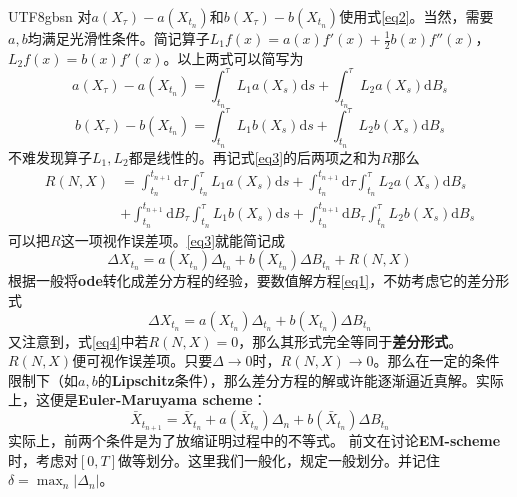 \documentclass{article}
\begin{document}
\begin{CJK*}{UTF8}{gbsn}
对$a(X_\tau)-a(X_{t_{n}})$和$b(X_\tau)-b(X_{t_{n}})$使用式\ref{eq2}。当然，需要$a,b$均满足光滑性条件。简记算子$L_1f(x)=a(x)f'(x)+\frac{1}{2}b(x)f''(x)$，$L_2f(x)=b(x)f'(x)$。以上两式可以简写为
\begin{equation}\label{eq6}
a(X_\tau)-a(X_{t_{n}})=\int_{t_n}^\tau L_1a(X_s)\mathrm{d}s+\int_{t_n}^\tau L_2a(X_s)\mathrm{d}B_s
\end{equation}
\begin{equation}\label{eq7}
b(X_\tau)-b(X_{t_{n}})=\int_{t_n}^\tau L_1b(X_s)\mathrm{d}s+\int_{t_n}^\tau L_2b(X_s)\mathrm{d}B_s
\end{equation}
不难发现算子$L_1,L_2$都是线性的。再记式\ref{eq3}的后两项之和为$R$那么
\begin{equation}\begin{aligned}
R(N,X)
&=\int_{t_n}^{t_{n+1}}\mathrm{d}\tau\int_{t_n}^\tau L_1a(X_s)\mathrm{d}s+
\int_{t_n}^{t_{n+1}}\mathrm{d}\tau\int_{t_n}^\tau L_2a(X_s)\mathrm{d}B_s\\
&+\int_{t_n}^{t_{n+1}}\mathrm{d}B_\tau\int_{t_n}^\tau L_1b(X_s)\mathrm{d}s
+\int_{t_n}^{t_{n+1}}\mathrm{d}B_\tau\int_{t_n}^\tau L_2b(X_s)\mathrm{d}B_s
\end{aligned}\label{eq8}\end{equation}
可以把$R$这一项视作误差项。\ref{eq3}就能简记成
\begin{equation}
    \Delta X_{t_n}=a(X_{t_n})\Delta_{t_n}+b(X_{t_{n}})\Delta B_{t_n}+R(N,X)\label{eq4}
\end{equation}
根据一般将\textbf{ode}转化成差分方程的经验，要数值解方程\ref{eq1}，不妨考虑它的差分形式
$$
    \Delta X_{t_n}=a(X_{t_n})\Delta_{t_n}+b(X_{t_{n}})\Delta B_{t_n}
$$
又注意到，式\ref{eq4}中若$R(N,X)=0$，那么其形式完全等同于\textbf{差分形式}。$R(N,X)$便可视作误差项。只要$\Delta\to0$时，$R(N,X)\to0$。那么在一定的条件限制下（如$a,b$的\textbf{Lipschitz}条件），那么差分方程的解或许能逐渐逼近真解。实际上，这便是\textbf{Euler-Maruyama scheme}：
\begin{equation}
    \bar{X}_{t_{n+1}}=\bar{X}_{t_n}+a(\bar{X}_{t_{n}})\Delta_n+b(\bar{X}_{t_{n}})\Delta B_{t_n}\label{em}
\end{equation}
实际上，前两个条件是为了放缩证明过程中的不等式。
前文在讨论\textbf{EM-scheme}时，考虑对$[0,T]$做等划分。这里我们一般化，规定一般划分。并记住$\delta=\max_n|\Delta_n|$。



\end{CJK*}
\end{document}
